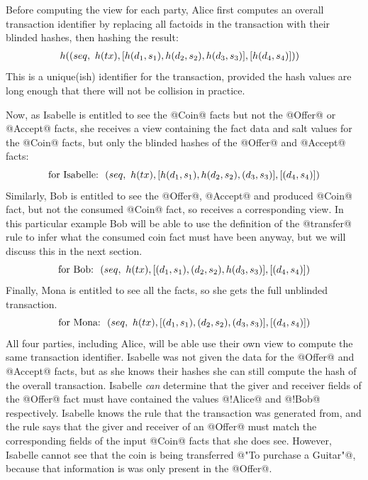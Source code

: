 Before computing the view for each party, Alice first computes an overall transaction identifier by replacing all factoids in the transaction with their blinded hashes, then hashing the result:
$$
\begin{array}{rl}
 \hspace{-2ex} h((seq,~ h(tx), [h(d_1, s_1), h(d_2, s_2), h(d_3, s_3)], [h(d_4, s_4)]))
\end{array}
$$
This is a unique(ish) identifier for the transaction, provided the hash values are long enough that there will not be collision in practice.

Now, as Isabelle is entitled to see the @Coin@ facts but not the @Offer@ or @Accept@ facts, she receives a view containing the fact data and salt values for the @Coin@ facts, but only the blinded hashes of the @Offer@ and @Accept@ facts:
$$
\textrm{for Isabelle:}~~(seq,~ h(tx), [h(d_1, s_1), h(d_2, s_2), (d_3, s_3)], [(d_4, s_4)])
$$
Similarly, Bob is entitled to see the @Offer@, @Accept@ and produced @Coin@ fact, but not the consumed @Coin@ fact, so receives a corresponding view. In this particular example Bob will be able to use the definition of the @transfer@ rule to infer what the consumed coin fact must have been anyway, but we will discuss this in the next section.
$$
\textrm{for Bob:}~~(seq,~ h(tx), [(d_1, s_1), (d_2, s_2), h(d_3, s_3)], [(d_4, s_4)])
$$
Finally, Mona is entitled to see all the facts, so she gets the full unblinded transaction.
$$
\textrm{for Mona:}~~(seq,~ h(tx), [(d_1, s_1), (d_2, s_2), (d_3, s_3)], [(d_4, s_4)])
$$
All four parties, including Alice, will be able use their own view to compute the same transaction identifier. Isabelle was not given the data for the @Offer@ and @Accept@ facts, but as she knows their hashes she can still compute the hash of the overall transaction. Isabelle \emph{can} determine that the giver and receiver fields of the @Offer@ fact must have contained the values @!Alice@ and @!Bob@ respectively. Isabelle knows the rule that the transaction was generated from, and the rule says that the giver and receiver of an @Offer@ must match the corresponding fields of the input @Coin@ facts that she does see. However, Isabelle cannot see that the coin is being transferred @"To purchase a Guitar"@, because that information is was only present in the @Offer@.


